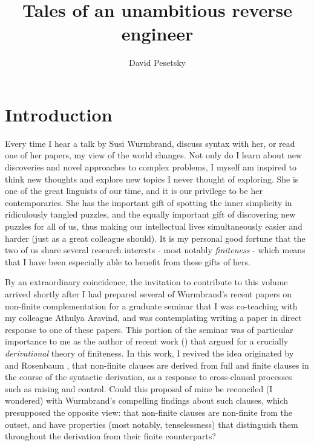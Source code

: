 \documentclass[output=paper]{langscibook}
\author{David Pesetsky\orcid{0000-0003-1530-9230}\affiliation{Massachusetts Institute of Technology}}
\title{Tales of an unambitious reverse engineer}
\begin{document}
\maketitle

\section{Introduction}

Every time I hear a talk by Susi Wurmbrand, discuss syntax with her, or read one of her papers, my view of the world changes. Not only do I learn about new discoveries and novel approaches to complex problems, I myself am inspired to think new thoughts and explore new topics I never thought of exploring. She is one of the great linguists of our time, and it is our privilege to be her contemporaries. She has the important gift of spotting the inner simplicity in ridiculously tangled puzzles, and the equally important gift of discovering new puzzles for all of us, thus making our intellectual lives simultaneously easier and harder (just as a great colleague should). It is my personal good fortune that the two of us share several research interests - most notably \textit{finiteness} - which means that I have been especially able to benefit from these gifts of hers.

By an extraordinary coincidence, the invitation to contribute to this volume arrived shortly after I had prepared several of Wurmbrand's recent papers on non-finite complementation for a graduate seminar that I was co-teaching with my colleague Athulya Aravind, and was contemplating writing a paper in direct response to one of these papers. This portion of the seminar was of particular importance to me as the author of recent work (\citealt{Pesetsky:2019aa}) that argued for a crucially \textit{derivational} theory of finiteness. In this work, I revived the idea originated by \citet{Lees1963} and Rosenbaum \citeyearpar{Rosenbaum:1965aa,Rosenbaum1967}, that non-finite clauses are derived from full and finite clauses in the course of the syntactic derivation, as a response to cross-clausal processes such as raising and control. Could this proposal of mine be reconciled (I wondered) with Wurmbrand's compelling findings about such clauses, which presupposed the opposite view: that non-finite clauses are non-finite from the outset, and have properties (most notably, tenselessness) that distinguish them throughout the derivation from their finite counterparts? 
\end{document}
